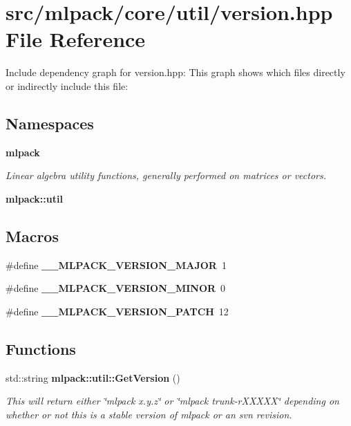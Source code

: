 \section{src/mlpack/core/util/version.hpp File Reference}
\label{src_2mlpack_2core_2util_2version_8hpp}
Include dependency graph for version.\-hpp\-:
This graph shows which files directly or indirectly include this file\-:
\subsection*{Namespaces}
\begin{DoxyCompactItemize}
\item 
{\bf mlpack}
\begin{DoxyCompactList}\small\item\em Linear algebra utility functions, generally performed on matrices or vectors. \end{DoxyCompactList}\item 
{\bf mlpack\-::util}
\end{DoxyCompactItemize}
\subsection*{Macros}
\begin{DoxyCompactItemize}
\item 
\#define {\bf \-\_\-\-\_\-\-M\-L\-P\-A\-C\-K\-\_\-\-V\-E\-R\-S\-I\-O\-N\-\_\-\-M\-A\-J\-O\-R}~1
\item 
\#define {\bf \-\_\-\-\_\-\-M\-L\-P\-A\-C\-K\-\_\-\-V\-E\-R\-S\-I\-O\-N\-\_\-\-M\-I\-N\-O\-R}~0
\item 
\#define {\bf \-\_\-\-\_\-\-M\-L\-P\-A\-C\-K\-\_\-\-V\-E\-R\-S\-I\-O\-N\-\_\-\-P\-A\-T\-C\-H}~12
\end{DoxyCompactItemize}
\subsection*{Functions}
\begin{DoxyCompactItemize}
\item 
std\-::string {\bf mlpack\-::util\-::\-Get\-Version} ()
\begin{DoxyCompactList}\small\item\em This will return either \char`\"{}mlpack x.\-y.\-z\char`\"{} or \char`\"{}mlpack trunk-\/r\-X\-X\-X\-X\-X\char`\"{} depending on whether or not this is a stable version of mlpack or an svn revision. \end{DoxyCompactList}\end{DoxyCompactItemize}


